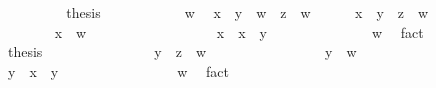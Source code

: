 \begin{isabellebody}
\isanewline
\ \ \ \ \ \ \isamarkupfalse%
\ \isamarkupfalse%
\ {\isacharquery}thesis\ \isacommand{{\isachardot}}\isamarkupfalse%
\isanewline
\ \ \ \ \isamarkupfalse%
\isanewline
\ \ \ \ \isamarkupfalse%
\ w\ \isamarkupfalse%
\ {\isachardoublequoteopen}x\ {\isasymsqunion}\ y\ {\isasymsqsubseteq}\ w{\isachardoublequoteclose}\ \ {\isachardoublequoteopen}z\ {\isasymsqsubseteq}\ w{\isachardoublequoteclose}\isanewline
\ \ \ \ \isamarkupfalse%
\ {\isachardoublequoteopen}x\ {\isasymsqunion}\ {\isacharparenleft}y\ {\isasymsqunion}\ z{\isacharparenright}\ {\isasymsqsubseteq}\ w{\isachardoublequoteclose}\isanewline
\ \ \ \ \isamarkupfalse%
\isanewline
\ \ \ \ \ \ \isamarkupfalse%
\ {\isachardoublequoteopen}x\ {\isasymsqsubseteq}\ w{\isachardoublequoteclose}\isanewline
\ \ \ \ \ \ \isamarkupfalse%
\ {\isacharminus}\isanewline
\ \ \ \ \ \ \ \ \isamarkupfalse%
\ {\isachardoublequoteopen}x\ {\isasymsqsubseteq}\ x\ {\isasymsqunion}\ y{\isachardoublequoteclose}\ \isacommand{{\isachardot}{\isachardot}}\isamarkupfalse%
\isanewline
\ \ \ \ \ \ \ \ \isamarkupfalse%
\ \isamarkupfalse%
\ {\isachardoublequoteopen}{\isasymdots}\ {\isasymsqsubseteq}\ w{\isachardoublequoteclose}\ \isamarkupfalse%
\ fact\isanewline
\ \ \ \ \ \ \ \ \isamarkupfalse%
\ \isamarkupfalse%
\ {\isacharquery}thesis\ \isacommand{{\isachardot}}\isamarkupfalse%
\isanewline
\ \ \ \ \ \ \isamarkupfalse%
\isanewline
\ \ \ \ \ \ \isamarkupfalse%
\ {\isachardoublequoteopen}y\ {\isasymsqunion}\ z\ {\isasymsqsubseteq}\ w{\isachardoublequoteclose}\isanewline
\ \ \ \ \ \ \isamarkupfalse%
\isanewline
\ \ \ \ \ \ \ \ \isamarkupfalse%
\ {\isachardoublequoteopen}y\ {\isasymsqsubseteq}\ w{\isachardoublequoteclose}\isanewline
\ \ \ \ \ \ \ \ \isamarkupfalse%
\ {\isacharminus}\isanewline
\ \ \ \ \ \ \ \ \ \ \isamarkupfalse%
\ {\isachardoublequoteopen}y\ {\isasymsqsubseteq}\ x\ {\isasymsqunion}\ y{\isachardoublequoteclose}\ \isacommand{{\isachardot}{\isachardot}}\isamarkupfalse%
\isanewline
\ \ \ \ \ \ \ \ \ \ \isamarkupfalse%
\ \isamarkupfalse%
\ {\isachardoublequoteopen}{\isachardot}{\isachardot}{\isachardot}\ {\isasymsqsubseteq}\ w{\isachardoublequoteclose}\ \isamarkupfalse%
\ fact\isanewline
\ \ \ \ \ \ \ \ \ \ \isamarkupfalse%

\end{isabellebody}
